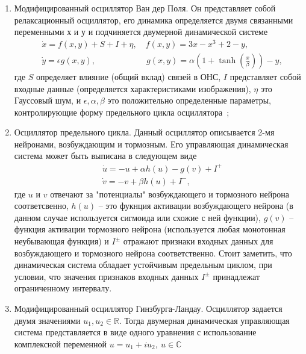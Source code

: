 \documentclass[14pt, russian]{scrartcl}
\begin{document}
\begin{enumerate}
    \item Модифицированный осциллятор Ван дер Поля. Он представляет собой релаксационный осциллятор, его динамика определяется двумя связанными переменными х и у и подчиняется двумерной динамической системе
        \begin{equation}\label{eq:1}
            \begin{split}
                &\dot{x} = f(x,y) + S + I + \eta, \quad f(x,y) = 3x - x^3 + 2 - y,\\
                &\dot{y} = \epsilon g(x, y), \qquad \qquad \qquad g(x, y) = \alpha(1 + \tanh(\frac{x}{\beta})) - y,
            \end{split} 
        \end{equation}где $S$ определяет влияние (общий вклад) связей в ОНС, $I$ представляет собой входные данные (определяется характеристиками изображения), $\eta$ это Гауссовый шум, и $\epsilon,\alpha,\beta$ это положительно определенные параметры, контролирующие форму предельного цикла осциллятора~\cite{27};
    \item Осциллятор предельного цикла. Данный осциллятор описывается 2-мя нейронами, возбуждающим и тормозным. Его управляющая динамическая система может быть выписана в следующем виде
        \begin{equation}\label{eq:2}
            \begin{split}
                &\dot{u} = -u + \alpha h(u) - g(v) + I^+\\
                &\dot{v} = -v + \beta h(u) + I^-,
            \end{split} 
        \end{equation}где $u$ и $v$ отвечают за "потенциалы" возбуждающего и тормозного нейрона соответсвенно, $h(u)$ -- это фукнция активации возбуждающего нейрона (в данном случае используется сигмоида или схожие с ней функции), $g(v)$ -- функция активации тормозного нейрона (используется любая монотонная неубывающая функция) и $I^\pm$ отражают признаки входных данных для возбуждающего и тормозного нейрона соответственно.
        Стоит заметить, что динамическая система обладает устойчивым предельным циклом, при условии, что значения признаков входных данных $I^\pm$ принадлежат ограниченному интервалу.
    \item Модифицированный осциллятор Гинзбурга-Ландау. Осциллятор задается двумя значениями $u_1, u_2 \in \mathbb{R} $. Тогда двумерная динамическая управляющая система представляется в виде одного уравнения с использование комплексной переменной $u = u_1 + i u_2,\ u \in \mathbb{C}$

\end{enumerate}
\end{document}
